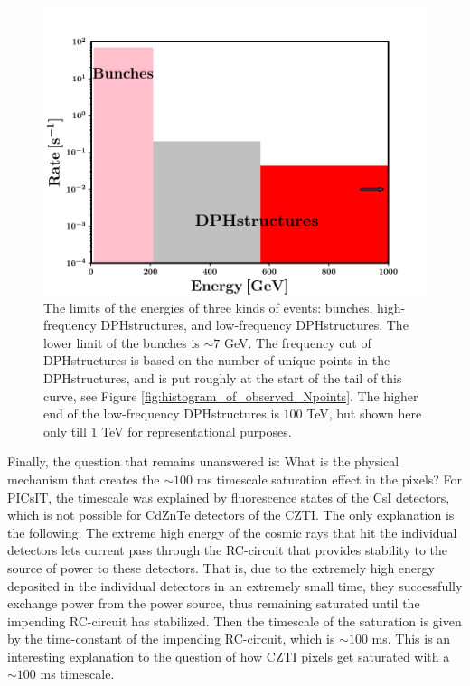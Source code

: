 \begin{figure}
\begin{center}
\includegraphics[scale=0.5]{Energy_limits}
\caption[Energy limits of bunches and DPHstructures]{The limits of the energies of three kinds of events: bunches, high-frequency DPHstructures, and low-frequency DPHstructures. The lower limit of the bunches is $ \sim 7 $ GeV. The frequency cut of DPHstructures is based on the number of unique points in the DPHstructures, and is put roughly at the start of the tail of this curve, see Figure \ref{fig:histogram_of_observed_Npoints}. The higher end of the low-frequency DPHstructures is $100$ TeV, but shown here only till $1$ TeV for representational purposes.}
\label{fig:Energy_limits}
\end{center}
\end{figure}


Finally, the question that remains unanswered is: What is the physical mechanism that creates the $\sim 100$ ms timescale saturation effect in the pixels? For PICsIT, the timescale was explained by fluorescence states of the CsI detectors, which is not possible for CdZnTe detectors of the CZTI. The only explanation is the following: The extreme high energy of the cosmic rays that hit the individual detectors lets current pass through the RC-circuit that provides stability to the source of power to these detectors. That is, due to the extremely high energy deposited in the individual detectors in an extremely small time, they successfully exchange power from the power source, thus remaining saturated until the impending RC-circuit has stabilized. Then the timescale of the saturation is given by the time-constant of the impending RC-circuit, which is $\sim 100$ ms. This is an interesting explanation to the question of how CZTI pixels get saturated with a $\sim 100$ ms timescale.


